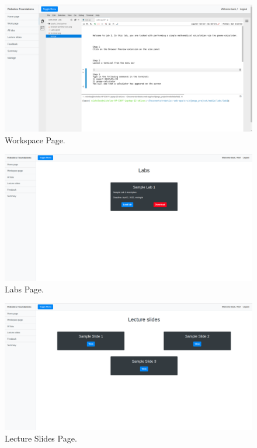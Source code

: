\documentclass{l4proj}
\begin{document}
\begin{appendices}
\begin{figure}[h]
    \centering
    \includegraphics[scale=0.20]{images/workspace_design.png}
    \caption{Workspace Page.}
\end{figure}


\begin{figure}[h]
    \centering
    \includegraphics[scale=0.20]{images/lab_page.png}
    \caption{Labs Page.}
\end{figure}

\begin{figure}[h]
    \centering
    \includegraphics[scale=0.20]{images/slides_page.png}
    \caption{Lecture Slides Page.}
\end{figure}



\end{appendices}
\end{document}
